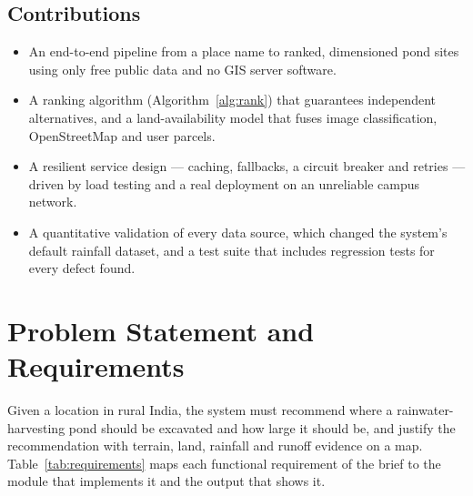 \documentclass[manuscript,screen,review]{acmart}
\begin{document}
\subsection{Contributions}
\begin{itemize}
  \item An end-to-end pipeline from a place name to ranked, dimensioned pond sites using only
    free public data and no GIS server software.
  \item A ranking algorithm (Algorithm~\ref{alg:rank}) that guarantees independent
    alternatives, and a land-availability model that fuses image classification,
    OpenStreetMap and user parcels.
  \item A resilient service design --- caching, fallbacks, a circuit breaker and retries ---
    driven by load testing and a real deployment on an unreliable campus network.
  \item A quantitative validation of every data source, which changed the system's default
    rainfall dataset, and a test suite that includes regression tests for every defect found.
\end{itemize}

\section{Problem Statement and Requirements}
\label{sec:requirements}
Given a location in rural India, the system must recommend where a rainwater-harvesting pond
should be excavated and how large it should be, and justify the recommendation with terrain,
land, rainfall and runoff evidence on a map. Table~\ref{tab:requirements} maps each functional
requirement of the brief to the module that implements it and the output that shows it.
\end{document}
